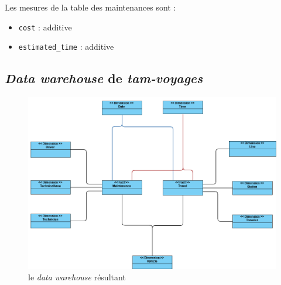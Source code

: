 \documentclass[a4paper,12pt]{report}
\begin{document}
Les mesures de la table des maintenances sont :
\begin{itemize}
  \item \texttt{cost} : additive
  \item \texttt{estimated\_time} : additive
\end{itemize}

\newpage

\subsection*{\textit{Data warehouse} de \textit{tam-voyages}}
\label{subsec:data_warehouse}
\begin{figure}[!ht]
  \centering
  \includegraphics[scale=0.6]{images/data_warehouse.png}
  \caption{le \textit{data warehouse} résultant}
\end{figure}

\newpage
\end{document}
